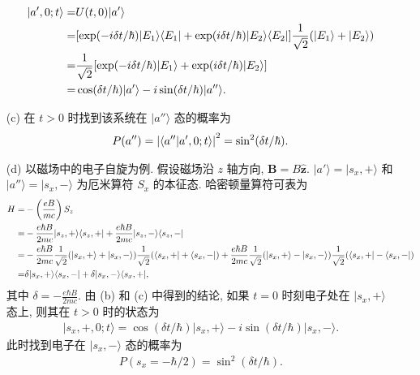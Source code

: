 \documentclass{assignment}
\begin{document}
\begin{sol}
\begin{itemize}
\begin{align}
            \notag\lvert a',0;t\rangle=&U(t,0)\lvert a'\rangle\\
            \notag=&[\exp(-i\delta t/\hbar)\lvert E_1\rangle\langle E_1\rvert+\exp(i\delta t/\hbar)\lvert E_2\rangle\langle E_2\rvert]\frac{1}{\sqrt{2}}(\lvert E_1\rangle+\lvert E_2\rangle)\\
            \notag=&\frac{1}{\sqrt{2}}[\exp(-i\delta t/\hbar)\lvert E_1\rangle+\exp(i\delta t/\hbar)\lvert E_2\rangle]\\
            =&\cos(\delta t/\hbar)\lvert a'\rangle-i\sin(\delta t/\hbar)\lvert a''\rangle.
        \end{align}
        \item[(c)] 在 $t>0$ 时找到该系统在 $\lvert a''\rangle$ 态的概率为
        \begin{align}
            P(a'')=\left\lvert\langle a''\vert a',0;t\rangle\right\rvert^2=\sin^2(\delta t/\hbar).
        \end{align}
        \item[(d)] 以磁场中的电子自旋为例. 假设磁场沿 $z$ 轴方向, $\bm{B}=B\hat{\bm{z}}$. $\lvert a'\rangle=\lvert s_x,+\rangle$ 和 $\lvert a''\rangle=\lvert s_x,-\rangle$ 为厄米算符 $S_x$ 的本征态. 哈密顿量算符可表为
        \begin{align}
            \notag H=&-\left(\frac{eB}{mc}\right)S_z\\
            \notag=&-\frac{e\hbar B}{2mc}\lvert s_z,+\rangle\langle s_z,+\rvert+\frac{e\hbar B}{2mc}\lvert s_z,-\rangle\langle s_z,-\rvert\\
            \notag=&-\frac{e\hbar B}{2mc}\frac{1}{\sqrt{2}}(\lvert s_x,+\rangle+\lvert s_x,-\rangle)\frac{1}{\sqrt{2}}(\langle s_x,+\rvert+\langle s_x,-\rvert)+\frac{e\hbar B}{2mc}\frac{1}{\sqrt{2}}(\lvert s_x,+\rangle-\lvert s_x,-\rangle)\frac{1}{\sqrt{2}}(\langle s_x,+\rvert-\langle s_x,-\rvert)\\
            \notag=&\delta\lvert s_x,+\rangle\langle s_x,-\rvert+\delta\lvert s_x,-\rangle\langle s_x,+\rvert,
        \end{align}
        其中 $\delta=-\frac{e\hbar B}{2mc}$. 由 (b) 和 (c) 中得到的结论, 如果 $t=0$ 时刻电子处在 $\lvert s_x,+\rangle$ 态上, 则其在 $t>0$ 时的状态为
        \begin{align}
            \lvert s_x,+,0;t\rangle=\cos(\delta t/\hbar)\lvert s_x,+\rangle-i\sin(\delta t/\hbar)\lvert s_x,-\rangle.
        \end{align}
        此时找到电子在 $\lvert s_x,-\rangle$ 态的概率为
        \begin{align}
            P(s_x=-\hbar/2)=\sin^2(\delta t/\hbar).
        \end{align}
    \end{itemize}
\end{sol}
\end{document}
